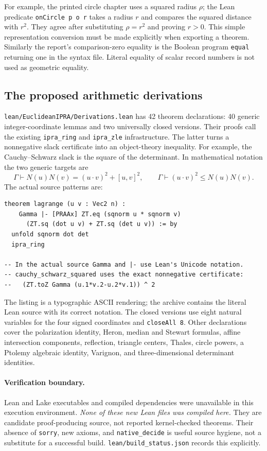 For example, the printed circle chapter uses a squared radius $\rho$;
the Lean predicate \texttt{onCircle p o r} takes a radius $r$ and compares
the squared distance with $r^2$. They agree after substituting
$\rho=r^2$ and proving $r>0$. This simple representation conversion
must be made explicitly when exporting a theorem. Similarly the report's
comparison-zero equality is the Boolean program \texttt{equal} returning
one in the syntax file. Literal equality of scalar record numbers is not
used as geometric equality.

\subsection{The proposed arithmetic derivations}
\texttt{lean/EuclideanIPRA/Derivations.lean} has 42 theorem declarations:
40 generic integer-coordinate lemmas and two universally closed versions.
Their proofs call the existing \texttt{ipra\_ring} and
\texttt{ipra\_zle} infrastructure. The latter turns a nonnegative slack
certificate into an object-theory inequality. For example, the
Cauchy--Schwarz slack is the square of the determinant. In mathematical
notation the two generic targets are
\[
 \Gamma\vdash N(u)N(v)=(u\cdot v)^2+[u,v]^2,
 \qquad \Gamma\vdash (u\cdot v)^2\le N(u)N(v).
\]
The actual source patterns are:
\begin{lstlisting}
theorem lagrange (u v : Vec2 n) :
    Gamma |- [PRAAx] ZT.eq (sqnorm u * sqnorm v)
      (ZT.sq (dot u v) + ZT.sq (det u v)) := by
  unfold sqnorm dot det
  ipra_ring

-- In the actual source Gamma and |- use Lean's Unicode notation.
-- cauchy_schwarz_squared uses the exact nonnegative certificate:
--   (ZT.toZ Gamma (u.1*v.2-u.2*v.1)) ^ 2
\end{lstlisting}
The listing is a typographic ASCII rendering; the archive contains the
literal Lean source with its correct notation. The closed versions use
eight natural variables for the four signed coordinates and
\texttt{closeAll 8}. Other declarations cover the polarization identity,
Heron, median and Stewart formulas, affine intersection components,
reflection, triangle centers, Thales, circle powers, a Ptolemy algebraic
identity, Varignon, and three-dimensional determinant identities.

\paragraph{Verification boundary.}
Lean and Lake executables and compiled dependencies were unavailable in
this execution environment. \emph{None of these new Lean files was
compiled here.} They are candidate proof-producing source, not reported
kernel-checked theorems. Their absence of \texttt{sorry}, new axioms, and
\texttt{native\_decide} is useful source hygiene, not a substitute for a
successful build. \texttt{lean/build\_status.json} records this explicitly.

